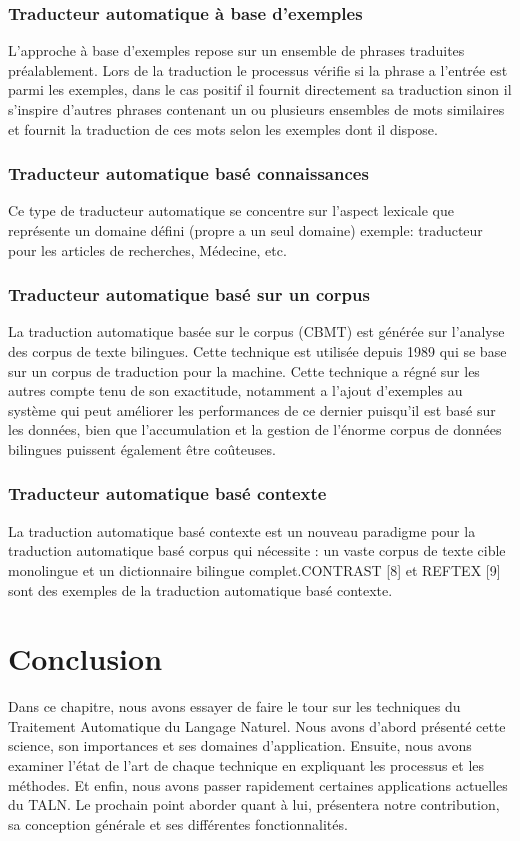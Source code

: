         \subsubsection{Traducteur automatique à base d'exemples}
        L'approche à base d'exemples repose sur un ensemble de phrases traduites préalablement. Lors de la traduction le processus vérifie si la phrase a l'entrée est parmi les exemples, dans le cas positif il fournit directement sa traduction sinon il s'inspire d'autres phrases contenant un ou plusieurs ensembles de mots similaires et fournit la traduction de ces mots selon les exemples dont il dispose.\cite{setif}
        \subsubsection{Traducteur automatique basé connaissances}
        Ce type de traducteur automatique se concentre sur l'aspect lexicale que représente un domaine défini (propre a un seul domaine) exemple: traducteur pour les articles de recherches, Médecine, etc.\cite{surveyTraduction}
        \subsubsection{Traducteur automatique basé sur un corpus}
        La traduction automatique basée sur le corpus (CBMT) est générée sur l'analyse des corpus de texte bilingues. Cette technique est utilisée depuis 1989 qui se base sur un corpus de traduction pour la machine. Cette technique a régné sur les autres compte tenu de son exactitude, notamment a l'ajout d'exemples au système qui peut améliorer les performances de ce dernier puisqu'il est basé sur les données, bien que l'accumulation et la gestion de l'énorme corpus de données bilingues puissent également être coûteuses.\cite{jean}
        \subsubsection{Traducteur automatique basé contexte}
        La traduction automatique basé contexte est un nouveau paradigme pour la traduction automatique basé corpus qui nécessite : un vaste corpus de texte cible monolingue et un dictionnaire bilingue complet.CONTRAST [8] et REFTEX [9] sont des exemples de la traduction automatique basé contexte.


\section{Conclusion}
Dans ce chapitre, nous avons essayer de faire le tour sur les techniques du Traitement Automatique du Langage Naturel. Nous avons d'abord présenté cette science, son importances et ses domaines d'application. Ensuite, nous avons examiner l'état de l'art de chaque technique en expliquant les processus et les méthodes. Et enfin, nous avons passer rapidement certaines applications actuelles du TALN.
Le prochain point aborder quant à lui, présentera notre contribution, sa conception générale et ses différentes fonctionnalités.  